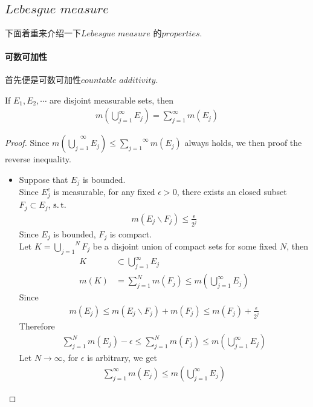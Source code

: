 \newpage
\subsection{$Lebesgue \,\, measure$}
	下面着重来介绍一下$Lebesgue \,\, measure$ 的$properties$.
	
	\vspace{2em}
\paragraph{可数可加性}
	首先便是可数可加性$countable \,\, additivity$.
	\begin{thm}\label{thm 1.3.2}
		If $E_1 , E_2 , \cdots $ are disjoint measurable sets, then
		\begin{align}
			m(\bigcup_{j = 1}^{\infty}{E_j}) = \sum_{j = 1}^{\infty}{m(E_j)}
		\end{align}
	
		\vspace{2em}
		\begin{proof}
			Since $m(\overset{\infty}{\underset{j = 1}{\bigcup}{E_j}}) \leq \overset{\infty}{\underset{j = 1}{\sum}}{m(E_j)}$ always holds, we then proof the reverse inequality.
			\begin{itemize}
				\item Suppose that $E_j$ is bounded.\\
				Since $E_{j}^c$ is measurable, for any fixed $\epsilon > 0$, there exists an closed subset $F_j \subset E_j$, $\operatorname{s.t.}$
				\begin{align}
					m(E_j \backslash F_j) \leq \frac{\epsilon}{2^j}
				\end{align}
				Since $E_j$ is bounded, $F_j$ is compact. \\
				Let $K = \overset{N}{\underset{j = 1}{\bigcup}}{F_j}$ be a disjoint union of compact sets for some fixed $N$, then
				\begin{align}
					K &\subset \bigcup_{j = 1}^{\infty}{E_j} \\
					m(K) &= \sum_{j = 1}^{N}{m(F_j)} \leq m(\bigcup_{j = 1}^{\infty}{E_j})
				\end{align}
				Since
				\begin{align}
					m(E_j) \leq m(E_j \backslash F_j) + m(F_j) \leq m(F_j) + \frac{\epsilon}{2^j}
				\end{align}
				Therefore
				\begin{align}
					\sum_{j = 1}^{N}{m(E_j)} - \epsilon \leq \sum_{j = 1}^{N}{m(F_j)} \leq m(\bigcup_{j = 1}^{\infty}{E_j})
				\end{align}
				Let $N \to \infty$, for $\epsilon$ is arbitrary, we get
				\begin{align}
					\sum_{j = 1}^{\infty}{m(E_j)} \leq m(\bigcup_{j = 1}^{\infty}{E_j})
				\end{align}
			

\end{itemize}
\end{proof}
\end{thm}

